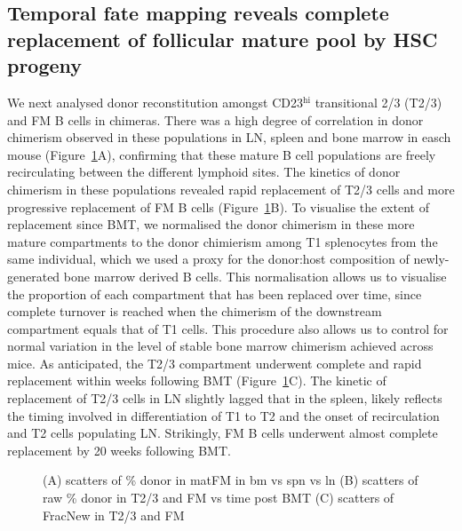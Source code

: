 \documentclass[12pt]{article}
\newcommand{\superscript}[1]{\ensuremath{^{\textrm{#1}}}} %
\newcommand{\red}[1]{{\color{red}{#1}}}
\begin{document}
\red{I think we need to reframe things hereon a bit, putting FM and GC on more of an equal footing. In particular the Ki67 section (below this one) refers to FM only}

\subsection*{Temporal fate mapping reveals complete replacement of follicular mature pool by HSC progeny}
We next analysed donor reconstitution amongst CD23\superscript{hi} transitional 2/3 (T2/3) and FM B cells in chimeras. There was a high degree of correlation in donor chimerism observed in these populations in LN, spleen and bone marrow in easch mouse (Figure~\ref{fig:Raw_FMplots}A), confirming that these  mature B cell populations are freely recirculating between the different lymphoid sites. The kinetics of donor chimerism in these populations revealed rapid replacement of T2/3 cells and more progressive replacement of FM B cells (Figure~\ref{fig:Raw_FMplots}B). To visualise the extent of replacement since BMT, we normalised the donor chimerism in these more mature compartments to the donor chimierism among T1 splenocytes from the same individual, which we used a proxy for the donor:host composition of newly-generated bone marrow derived B cells. This normalisation allows us to visualise the proportion of each compartment that has been replaced over time, since complete turnover is reached when the chimerism of the downstream compartment equals that of T1 cells. This procedure also allows us to control for normal variation in the level of stable bone marrow chimerism achieved across mice. As anticipated, the T2/3 compartment underwent complete and rapid replacement within \red{X} weeks following BMT (Figure~\ref{fig:Raw_FMplots}C). The kinetic of replacement of T2/3 cells in LN slightly lagged that in the spleen, likely reflects the timing involved in differentiation of T1 to T2 and the onset of recirculation and T2 cells populating LN. Strikingly, FM B cells underwent almost complete replacement by 20 weeks following BMT. \red{We should put GC in here too....?}


\begin{figure}[htbp] %
   \centering
   \caption{(A) scatters of \% donor in matFM in bm vs spn vs ln (B) scatters of raw \% donor in T2/3 and FM vs time post BMT (C) scatters of FracNew in T2/3 and FM }
   \label{fig:Raw_FMplots}
\end{figure}
\end{document}
